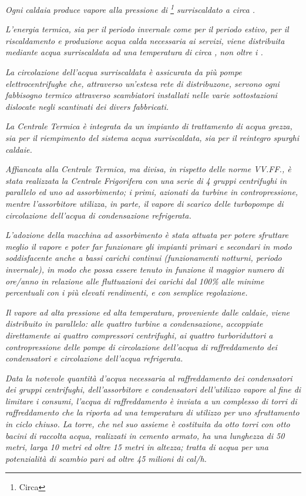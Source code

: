 \begin{quoting}
	\emph{Ogni caldaia produce vapore alla pressione di \footnote{Circa } surriscaldato a circa .}
	
	\emph{L'energia termica, sia per il periodo invernale come per il periodo estivo, per il riscaldamento e produzione acqua calda necessaria ai servizi, viene distribuita mediante acqua surriscaldata ad una temperatura di circa , non oltre i .}
	
	\sdots
	
	\emph{La circolazione dell'acqua surriscaldata è assicurata da più pompe elettrocentrifughe che, attraverso un'estesa rete di distribuzone, servono ogni fabbisogno termico attraverso scambiatori installati nelle varie sottostazioni dislocate negli scantinati dei divers fabbricati.}
	
	\emph{La Centrale Termica è integrata da un impianto di trattamento di acqua grezza, sia per il riempimento del sistema acqua surriscaldata, sia per il reintegro spurghi caldaie.}
	
	\emph{Affiancata alla Centrale Termica, ma divisa, in rispetto delle norme VV.FF., è stata realizzata la Centrale Frigorifera con una serie di 4 gruppi centrifughi in parallelo ed uno ad assorbimento; i primi, azionati da turbine in contropressione, mentre l'assorbitore utilizza, in parte, il vapore di scarico delle turbopompe di circolazione dell'acqua di condensazione refrigerata.}
	
	\emph{L'adozione della macchina ad assorbimento è stata attuata per potere sfruttare meglio il vapore e poter far funzionare gli impianti primari e secondari in modo soddisfacente anche a bassi carichi continui (funzionamenti notturni, periodo invernale), in modo che possa essere tenuto in funzione il maggior numero di ore/anno in relazione alle fluttuazioni dei carichi dal 100\% alle minime percentuali con i più elevati rendimenti, e con semplice regolazione.}
	
	\emph{Il vapore ad alta pressione ed alta temperatura, proveniente dalle caldaie, viene distribuito in parallelo: alle quattro turbine a condensazione, accoppiate direttamente ai quattro compressori centrifughi, ai quattro turboriduttori a contropressione delle pompe di circolazione dell'acqua di raffreddamento dei condensatori e circolazione dell'acqua refrigerata.}
	
	\sdots
	
	\emph{Data la notevole quantità d'acqua necessaria al raffreddamento dei condensatori dei gruppi centrifughi, dell'assorbitore e condensatori dell'utilizzo vapore al fine di limitare i consumi, l'acqua di raffreddamento è inviata a un complesso di torri di raffreddamento che la riporta ad una temperatura di utilizzo per uno sfruttamento in ciclo chiuso. La torre, che nel suo assieme è costituita da otto torri con otto bacini di raccolta acqua, realizzati in cemento armato, ha una lunghezza di 50 metri, larga 10 metri ed oltre 15 metri in altezza; tratta  di acqua per una potenzialità di scambio pari ad oltre 45 milioni di \si{cal/h}.}
\end{quoting}
